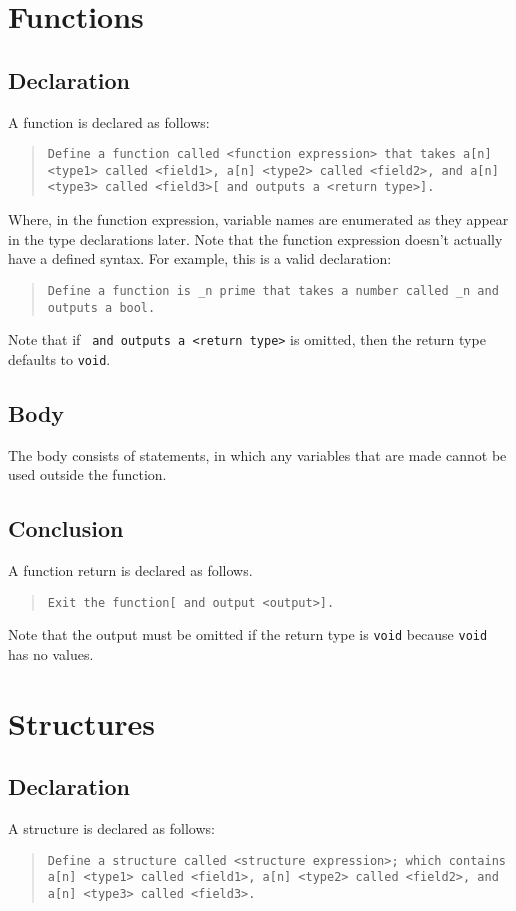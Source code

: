 \documentclass{article}
\newcommand{\code}[1]{\texttt{#1}}
\newcommand{\codeblock}[1]{\begin{quote}\code{#1}\end{quote}}
\begin{document}
\section{Functions}
\subsection{Declaration}
A function is declared as follows:

\codeblock{Define a function called <function expression> that takes a[n] <type1> called <field1>, a[n] <type2> called <field2>, and a[n] <type3> called <field3>[ and outputs a <return type>].}

Where, in the function expression, variable names are enumerated as they appear in the type declarations later. Note that the function expression doesn't actually have a defined syntax. For example, this is a valid declaration:

\codeblock{Define a function is \_{}n prime that takes a number called \_{}n and outputs a bool.}

Note that if \code{ and outputs a <return type>} is omitted, then the return type defaults to \code{void}.

\subsection{Body}
The body consists of statements, in which any variables that are made cannot be used outside the function.
\subsection{Conclusion}
A function return is declared as follows.

\codeblock{Exit the function[ and output <output>].}

Note that the output must be omitted if the return type is \code{void} because \code{void} has no values.

\section{Structures}
\subsection{Declaration}
A structure is declared as follows:

\codeblock{Define a structure called <structure expression>; which contains a[n] <type1> called <field1>, a[n] <type2> called <field2>, and a[n] <type3> called <field3>.}
\end{document}
